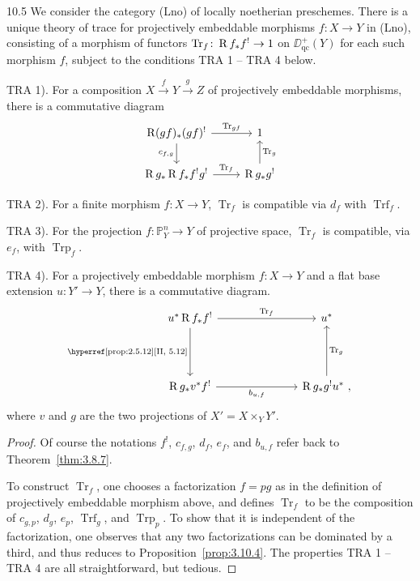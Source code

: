 \begin{booktheorem}{10.5}\label{thm:3.10.5}
We consider the category (Lno) of locally noetherian preschemes. There is a unique theory of trace for projectively embeddable morphisms $f\colon X\to Y$ in (Lno), consisting of a morphism of functors $\operatorname{Tr}_f\colon \operatorname{R} f_* f^!\to 1$ on $\DD_{\mathrm{qc}}^+(Y)$ for each such morphism $f$, subject to the conditions TRA 1 -- TRA 4 below.

TRA 1). For a composition $X\xrightarrow{f} Y\xrightarrow{g} Z$ of projectively embeddable morphisms, there is a commutative diagram
\[
\begin{tikzcd}
\RR(gf)_* (gf)^! \arrow[r, "\operatorname{Tr}_{gf}"] \arrow[d, "c_{f,g}"'] & 1 \\
\RR g_*\RR f_* f^!g^! \arrow[r, "\operatorname{Tr}_f"] & \RR g_* g^! \arrow[u, "\operatorname{Tr}_g"']
\end{tikzcd}
\]

TRA 2). For a finite morphism $f\colon X\to Y$, $\operatorname{Tr}_f$ is compatible via $d_f$ with $\operatorname{Trf}_f$.

TRA 3). For the projection $f\colon\mathbb{P}^n_Y\to Y$ of projective space, $\operatorname{Tr}_f$ is compatible, via $e_f$, with $\operatorname{Trp}_f$.

TRA 4). For a projectively embeddable morphism $f\colon X\to Y$ and a flat base extension $u\colon Y'\to Y$, there is a commutative diagram.
\[
\begin{tikzcd}[row sep=1.5cm, column sep=2.5cm]
	u^* \RR f_* f^! \arrow[r, "\Tr_f"] \arrow[d, "{\text{\bookref{prop:2.5.12}{II,~5.12}}}"']
	& u^* \\
	\RR g_* v^* f^! \arrow[r, "b_{u,f}"']
	& \RR g_* g^! u^* \arrow[u, "\Tr_g"']~,
\end{tikzcd}
\]
where $v$ and $g$ are the two projections of $X'=X\times_Y Y'$.
\end{booktheorem}

\begin{proof}
Of course the notations $f^!$, $c_{f,g}$, $d_f$, $e_f$, and $b_{u,f}$ refer back to Theorem~\ref{thm:3.8.7}.

To construct $\operatorname{Tr}_f$, one chooses a factorization $f=pg$ as in the definition of projectively embeddable morphism above, and defines $\operatorname{Tr}_f$ to be the composition of $c_{g,p}$, $d_g$, $e_p$, $\operatorname{Trf}_g$, and $\operatorname{Trp}_p$. To show that it is independent of the factorization, one observes that any two factorizations can be dominated by a third, and thus reduces to Proposition~\ref{prop:3.10.4}. The properties TRA 1 -- TRA 4 are all straightforward, but tedious.
\end{proof}

